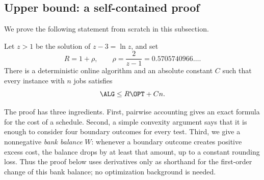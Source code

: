 \subsection{Upper bound: a self-contained proof}
\label{sec:upper}

We prove the following statement from scratch in this subsection.

\begin{theorem}
\label{thm:upper}
Let $z>1$ be the solution of $z-3=\ln z$, and set
\[
 R=1+\rho,
 \qquad
 \rho=\frac{2}{z-1}=0.5705740966\ldots .
\]
There is a deterministic online algorithm and an absolute constant $C$ such
that every instance with $n$ jobs satisfies
\[
  \ALG\le R\OPT+Cn.
\]
\end{theorem}

The proof has three ingredients.  First, pairwise accounting gives an exact
formula for the cost of a schedule.  Second, a simple convexity argument says
that it is enough to consider four boundary outcomes for every test.  Third,
we give a nonnegative \emph{bank balance} $W$: whenever a boundary outcome
creates positive excess cost, the balance drops by at least that amount, up
to a constant rounding loss.  Thus the proof below uses derivatives only as
shorthand for the first-order change of this bank balance; no optimization
background is needed.

